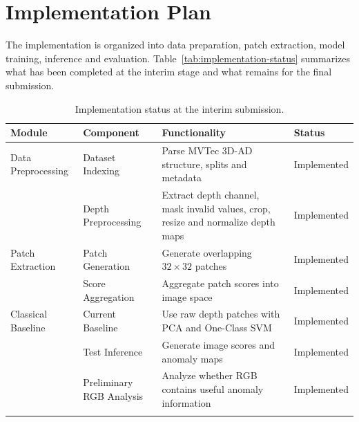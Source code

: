 \section{Implementation Plan}
The implementation is organized into data preparation, patch extraction, model training, inference and evaluation. Table~\ref{tab:implementation-status} summarizes what has been completed at the interim stage and what remains for the final submission.

\begin{table}[H]
\centering
\scriptsize
\renewcommand{\arraystretch}{1.25}

\caption{Implementation status at the interim submission.}

\begin{tabularx}{\columnwidth}{|
>{\raggedright\arraybackslash}p{1.8cm}|
>{\raggedright\arraybackslash}p{2cm}|
X|
>{\centering\arraybackslash}p{1.4cm}|}

\hline


\textbf{Module} &
\textbf{Component} &
\textbf{Functionality} &
\textbf{Status} \\ \hline

Data Preprocessing &
Dataset Indexing &
Parse MVTec 3D-AD structure, splits and metadata &
\cellcolor{implgreen}Implemented \\ \cline{2-4}

&
Depth Preprocessing &
Extract depth channel, mask invalid values, crop, resize and normalize depth maps &
\cellcolor{implgreen}Implemented \\ \hline

Patch Extraction &
Patch Generation &
Generate overlapping $32 \times 32$ patches &
\cellcolor{implgreen}Implemented \\ \cline{2-4}

&
Score Aggregation &
Aggregate patch scores into image space &
\cellcolor{implgreen}Implemented \\ \hline

Classical Baseline &
Current Baseline &
Use raw depth patches with PCA and One-Class SVM &
\cellcolor{implgreen}Implemented \\ \cline{2-4}

&
Test Inference &
Generate image scores and anomaly maps &
\cellcolor{implgreen}Implemented \\ \cline{2-4}

&
Preliminary RGB Analysis &
Analyze whether RGB contains useful anomaly information &
\cellcolor{implgreen}Implemented \\ \cline{2-4}


\end{tabularx}
\end{table}
